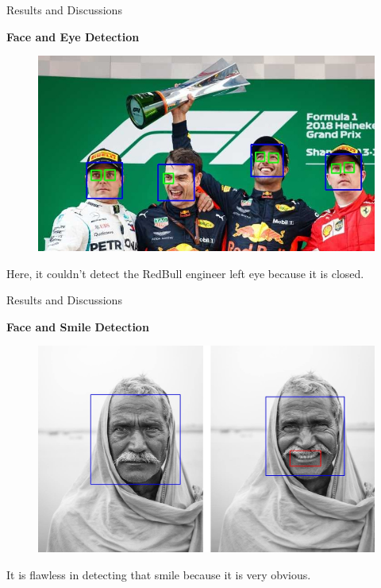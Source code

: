\documentclass[10pt]{beamer}
\begin{document}
\begin{frame}{Results and Discussions}

\centering
\textbf{Face and Eye Detection}

\begin{figure}
\vspace*{0cm}
\hspace*{0cm}
\includegraphics[scale=0.3]{samples/face_eye}
\end{figure}

\small Here, it couldn't detect the RedBull engineer left eye because it is closed.
\end{frame}



\begin{frame}{Results and Discussions}

\centering
\textbf{Face and Smile Detection}

\begin{figure}
\vspace*{0cm}
\hspace*{0cm}
\includegraphics[scale=0.15]{samples/face_smile}
\end{figure}

\small It is flawless in detecting that smile because it is very obvious.
\end{frame}
\end{document}
